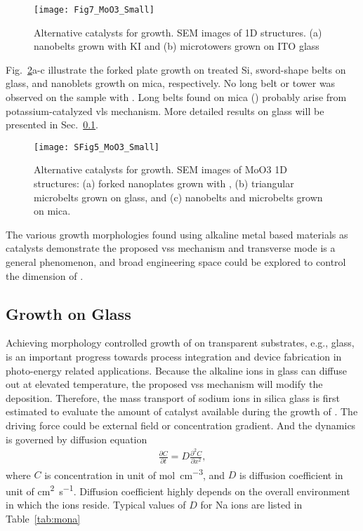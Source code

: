 \begin{figure}[htb]
\centering
\texttt{[image: Fig7\_MoO3\_Small]}
\caption[Alternative catalysts for  growth]{Alternative catalysts for  growth. SEM images of  1D structures. (a) nanobelts grown with KI and (b) microtowers grown on ITO glass}
\label{fig:ch4al1}
\end{figure}

Fig.~\ref{fig:ch4al2}a-c illustrate the forked plate growth on  treated Si, sword-shape belts on glass, and nanoblets growth on mica, respectively. No long belt or tower was observed on the sample with . Long belts found on mica () probably arise from potassium-catalyzed \gls{vls} mechanism.\cite{Hu2011} More detailed results on glass will be presented in Sec.~\ref{sec:glass}. 

\begin{figure}[htb]
\centering
\texttt{[image: SFig5\_MoO3\_Small]}
\caption[Alternative catalysts for  growth cont]{Alternative catalysts for  growth. SEM images of MoO3 1D structures: (a) forked nanoplates grown with , (b) triangular microbelts grown on glass, and (c) nanobelts and microbelts grown on mica.}
\label{fig:ch4al2}
\end{figure}

The various growth morphologies found using alkaline metal based materials as catalysts demonstrate the proposed \gls{vss} mechanism and transverse mode is a general phenomenon, and broad engineering space could be explored to control the dimension of . 

\subsection{Growth on Glass}\label{sec:glass}
Achieving morphology controlled growth of  on transparent substrates, e.g., glass, is an important progress towards process integration and device fabrication in photo-energy related applications. Because the alkaline ions in glass can diffuse out at elevated temperature, the proposed \gls{vss} mechanism will modify the  deposition. Therefore, the mass transport of sodium ions in silica glass is first estimated to evaluate the amount of catalyst available during the growth of . The driving force could be external field or concentration gradient. And the dynamics is governed by diffusion equation
\begin{align}\label{eq:nadiff}
\frac{\partial C}{\partial t} = D \frac{\partial^2 C}{\partial x^2},
\end{align}
where $C$ is concentration in unit of \si{mol\per cm^3}, and $D$ is diffusion coefficient in unit of \si{cm^2\per\second}. Diffusion coefficient highly depends on the overall environment in which the ions reside. Typical values of $D$ for Na ions are listed in Table~\ref{tab:mona}

